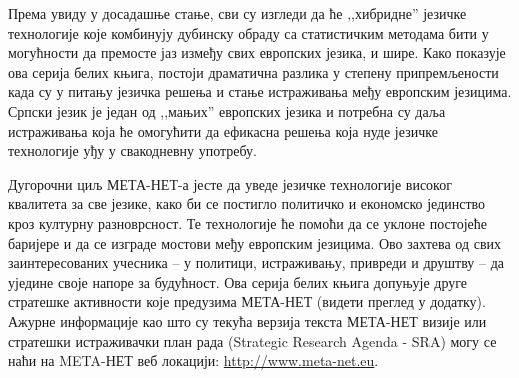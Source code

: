 \begin{multicols}{2}

Према увиду у досадашње стање, сви су изгледи да ће ,,хибридне'' језичке технологије које комбинују дубинску обраду са статистичким методама бити у могућности да премосте јаз између свих европских језика, и шире. Како показује ова серија белих књига, постоји драматична разлика у степену припремљености када су у питању језичка решења и стање истраживања међу европским језицима.  Српски језик је један од ,,мањих'' европских језика и потребна су даља истраживања која ће омогућити да ефикасна решења која нуде језичке технологије уђу у свакодневну употребу.

Дугорочни циљ МЕТА-НЕТ-а јесте да уведе језичке технологије високог квалитета за све језике, како би се постигло политичко и економско јединство кроз културну разноврсност. Те технологије ће помоћи да се уклоне постојеће баријере и да се изграде мостови међу европским језицима. Ово захтева од свих заинтересованих учесника – у политици, истраживању, привреди и друштву – да уједине своје напоре за будућност. Ова серија белих књига допуњује друге стратешке активности које предузима МЕТА-НЕТ (видети преглед у додатку). Ажурне информације као што су текућа верзија текста МЕТА-НЕТ визије \cite{Meta1} или стратешки истраживачки план рада (Strategic Research Agenda - SRA) могу се наћи на META-НЕТ веб локацији: \url{http://www.meta-net.eu}.   
    
\end{multicols}

\clearpage


  
